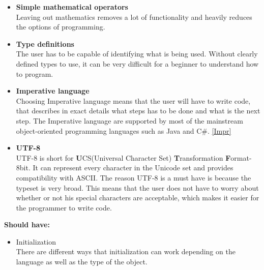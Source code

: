 \begin{itemize}
\item \textbf{Simple mathematical operators} \\
Leaving out mathematics removes a lot of functionality and heavily reduces the options of programming. \\

\item \textbf{Type definitions} \\
The user has to be capable of identifying what is being used. Without clearly defined types to use, it can be very difficult for a beginner to understand how to program. \\

\item \textbf{Imperative language} \\
Choosing Imperative language means that the user will have to write code, that describes in exact details what steps has to be done and what is the next step. The Imperative language are supported by most of the mainstream object-oriented programming languages such as Java and C\#. \ref{Impr}

\item \textbf{UTF-8} \\
UTF-8 is short for \textbf{U}CS(Universal Character Set) \textbf{T}ransformation \textbf{F}ormat-8bit. It can represent every character in the Unicode set and provides compatibility with ASCII. 
The reason UTF-8 is a must have is because the typeset is very broad. This means that the user does not have to worry about whether or not his special characters are acceptable, which makes it easier for the programmer to write code.\\
\end{itemize}

\textbf{Should have:}
\begin{itemize}
\item Initialization \\
There are different ways that initialization can work depending on the language as well as the type of the object. \\
\end{itemize}

